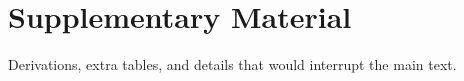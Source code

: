 \chapter{Supplementary Material}
\label{ch:appendix}

Derivations, extra tables, and details that would interrupt the main text.
